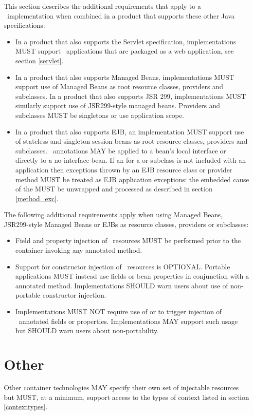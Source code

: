 This section describes the additional requirements that apply to a \jaxrs\ implementation when combined in a product that supports these other Java specifications:

\begin{itemize}
\item In a product that also supports the Servlet specification, implementations MUST support \jaxrs\ applications that are packaged as a web application, see section \ref{servlet}.
\item In a product that also supports Managed Beans, implementations MUST support use of Managed Beans as root resource classes, providers and  subclasses. In a product that also supports JSR 299, implementations MUST similarly support use of JSR299-style managed beans. Providers and  subclasses MUST be singletons or use application scope.
\item In a product that also supports EJB, an implementation MUST support use of stateless and singleton session beans as root resource classes, providers and  subclasses. \jaxrs\ annotations MAY be applied to a bean's local interface or directly to a no-interface bean. If an  for a  or subclass is not included with an application then exceptions thrown by an EJB resource class or provider method MUST be treated as EJB application exceptions: the embedded cause of the  MUST be unwrapped and processed as described in section \ref{method_exc}.
\end{itemize}

The following additional requirements apply when using Managed Beans, JSR299-style Managed Beans or EJBs as resource classes, providers or  subclasses:

\begin{itemize}
\item Field and property injection of \jaxrs\ resources MUST be performed prior to the container invoking any  annotated method.
\item Support for constructor injection of \jaxrs\ resources is OPTIONAL. Portable applications MUST instead use fields or bean properties in conjunction with a  annotated method. Implementations SHOULD warn users about use of non-portable constructor injection.
\item Implementations MUST NOT require use of  or  to trigger injection of \jaxrs\ annotated fields or properties. Implementations MAY support such usage but SHOULD warn users about non-portability.
\end{itemize}

\section{Other}

Other container technologies MAY specify their own set of injectable resources but MUST, at a minimum, support access to the types of context listed in section \ref{contexttypes}.